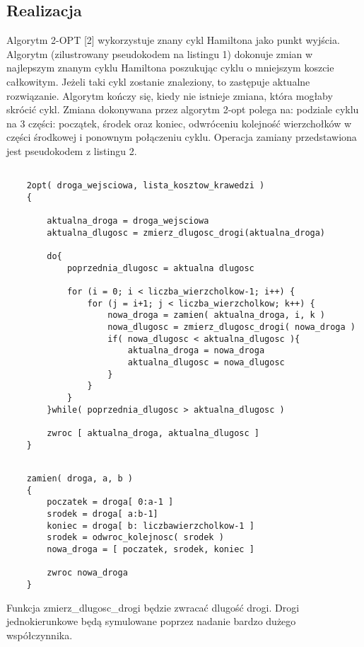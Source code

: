 \documentclass{article}
\begin{document}
\subsection{Realizacja}

Algorytm 2-OPT [2] wykorzystuje znany cykl Hamiltona jako punkt wyjścia. Algorytm (zilustrowany pseudokodem na listingu 1) dokonuje zmian w najlepszym znanym cyklu Hamiltona poszukując cyklu o mniejszym koszcie całkowitym. Jeżeli taki cykl zostanie znaleziony, to zastępuje aktualne rozwiązanie. Algorytm kończy się, kiedy nie istnieje zmiana, która mogłaby skrócić cykl. Zmiana dokonywana przez algorytm 2-opt polega na: podziale cyklu na 3 części: początek, środek oraz koniec, odwróceniu kolejność wierzchołków w części środkowej i ponownym połączeniu cyklu. Operacja zamiany przedstawiona jest pseudokodem z listingu 2. \\


\begin{lstlisting}[caption={Główna część algorytmu}]

	2opt( droga_wejsciowa, lista_kosztow_krawedzi )
	{
		
		aktualna_droga = droga_wejsciowa
		aktualna_dlugosc = zmierz_dlugosc_drogi(aktualna_droga)
	
		do{
			poprzednia_dlugosc = aktualna dlugosc

			for (i = 0; i < liczba_wierzcholkow-1; i++) {
				for (j = i+1; j < liczba_wierzcholkow; k++) {
					nowa_droga = zamien( aktualna_droga, i, k )
					nowa_dlugosc = zmierz_dlugosc_drogi( nowa_droga )
					if( nowa_dlugosc < aktualna_dlugosc ){
						aktualna_droga = nowa_droga
						aktualna_dlugosc = nowa_dlugosc				
					}				
				}
			}
		}while( poprzednia_dlugosc > aktualna_dlugosc )
		
		zwroc [ aktualna_droga, aktualna_dlugosc ]
	}

\end{lstlisting}

\begin{lstlisting}[caption={Funkcja modyfikująca aktualną ścieżkę}]

	zamien( droga, a, b )
	{
		poczatek = droga[ 0:a-1 ]
		srodek = droga[ a:b-1]
		koniec = droga[ b: liczbawierzcholkow-1 ]
		srodek = odwroc_kolejnosc( srodek )
		nowa_droga = [ poczatek, srodek, koniec ]
		
		zwroc nowa_droga
	}

\end{lstlisting}


Funkcja zmierz\_dlugosc\_drogi będzie zwracać dlugość drogi. Drogi jednokierunkowe będą symulowane poprzez nadanie bardzo dużego współczynnika. \\
\end{document}
